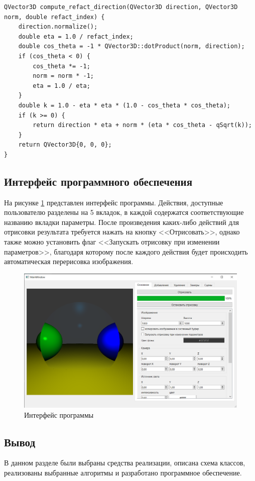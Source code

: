 \begin{lstlisting}[label=lst:compute_refact,caption=Функция направления преломленного луча]
QVector3D compute_refact_direction(QVector3D direction, QVector3D norm, double refact_index) {
	direction.normalize();
	double eta = 1.0 / refact_index;
	double cos_theta = -1 * QVector3D::dotProduct(norm, direction);
	if (cos_theta < 0) {
		cos_theta *= -1;
		norm = norm * -1;
		eta = 1.0 / eta;
	}
	double k = 1.0 - eta * eta * (1.0 - cos_theta * cos_theta);
	if (k >= 0) {
		return direction * eta + norm * (eta * cos_theta - qSqrt(k));
	}
	return QVector3D{0, 0, 0};
}
\end{lstlisting}

\clearpage

\subsection{Интерфейс программного обеспечения}

На рисунке \ref{img:ui} представлен интерфейс программы. Действия, доступные пользователю разделены на 5 вкладок, в каждой содержатся соответствующие названию вкладки параметры. После произведения каких-либо действий для отрисовки результата требуется нажать на кнопку <<Отрисовать>>, однако также можно установить флаг <<Запускать отрисовку при изменении параметров>>, благодаря которому после каждого действия будет происходить автоматическая перерисовка изображения.

\begin{figure}[h]
	\centering
	\includegraphics[scale=0.6]{inc/img/ui.png}
	\caption{Интерфейс программы}
	\label{img:ui}
\end{figure}

\clearpage

\subsection*{Вывод}
В данном разделе были выбраны средства реализации, описана схема классов, реализованы выбранные алгоритмы и разработано программное обеспечение.
\clearpage

